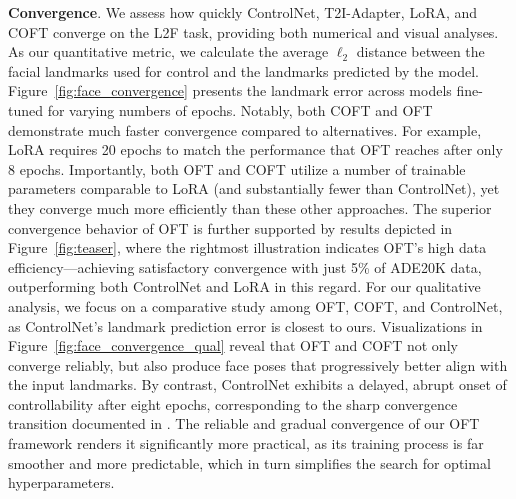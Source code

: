 {\textbf{Convergence}. We assess how quickly ControlNet, T2I-Adapter, LoRA, and COFT converge on the L2F task, providing both numerical and visual analyses. As our quantitative metric, we calculate the average $\ell_2$ distance between the facial landmarks used for control and the landmarks predicted by the model. Figure~\ref{fig:face_convergence} presents the landmark error across models fine-tuned for varying numbers of epochs. Notably, both COFT and OFT demonstrate much faster convergence compared to alternatives. For example, LoRA requires 20 epochs to match the performance that OFT reaches after only 8 epochs. Importantly, both OFT and COFT utilize a number of trainable parameters comparable to LoRA (and substantially fewer than ControlNet), yet they converge much more efficiently than these other approaches. The superior convergence behavior of OFT is further supported by results depicted in Figure~\ref{fig:teaser}, where the rightmost illustration indicates OFT’s high data efficiency—achieving satisfactory convergence with just 5\% of ADE20K data, outperforming both ControlNet and LoRA in this regard. For our qualitative analysis, we focus on a comparative study among OFT, COFT, and ControlNet, as ControlNet’s landmark prediction error is closest to ours. Visualizations in Figure~\ref{fig:face_convergence_qual} reveal that OFT and COFT not only converge reliably, but also produce face poses that progressively better align with the input landmarks. By contrast, ControlNet exhibits a delayed, abrupt onset of controllability after eight epochs, corresponding to the sharp convergence transition documented in \cite{zhang2023adding}. The reliable and gradual convergence of our OFT framework renders it significantly more practical, as its training process is far smoother and more predictable, which in turn simplifies the search for optimal hyperparameters.

}
